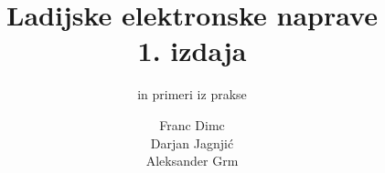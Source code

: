 \documentclass[envcountsame,envcountchap]{svmono}
\begin{document}
\author{Franc Dimc\\Darjan Jagnjić\\Aleksander Grm}
\title{Ladijske elektronske naprave\\[2mm]\Large{1. izdaja}}
\subtitle{in primeri iz prakse}
\maketitle

\frontmatter%




\tableofcontents


\mainmatter%


%
%



\backmatter%


\printindex

\end{document}
